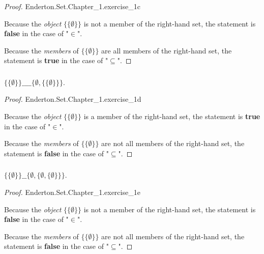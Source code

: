 \documentclass{report}
\begin{document}
\begin{proof}

    {Enderton.Set.Chapter\_1.exercise\_1c}

  Because the \textit{object} $\{\{\emptyset\}\}$ is not a member of the
    right-hand set, the statement is \textbf{false} in the case of "$\in$".

  Because the \textit{members} of $\{\{\emptyset\}\}$ are all members of the
    right-hand set, the statement is \textbf{true} in the case of "$\subseteq$".

\end{proof}

\subsubsection{}%
\label{ssub:baby-set-theory-1d}

$\{\{\emptyset\}\} \_\_\_\_ \{\emptyset, \{\{\emptyset\}\}\}$.

\begin{proof}

    {Enderton.Set.Chapter\_1.exercise\_1d}

  Because the \textit{object} $\{\{\emptyset\}\}$ is a member of the right-hand
    set, the statement is \textbf{true} in the case of "$\in$".

  Because the \textit{members} of $\{\{\emptyset\}\}$ are not all members of the
    right-hand set, the statement is \textbf{false} in the case of
    "$\subseteq$".

\end{proof}

\subsubsection{}%
\label{ssub:baby-set-theory-1e}

$\{\{\emptyset\}\} \_\_ \{\emptyset, \{\emptyset, \{\emptyset\}\}\}$.

\begin{proof}

    {Enderton.Set.Chapter\_1.exercise\_1e}

  Because the \textit{object} $\{\{\emptyset\}\}$ is not a member of the
    right-hand set, the statement is \textbf{false} in the case of "$\in$".

  Because the \textit{members} of $\{\{\emptyset\}\}$ are not all members of the
    right-hand set, the statement is \textbf{false} in the case of
    "$\subseteq$".

\end{proof}
\end{document}
